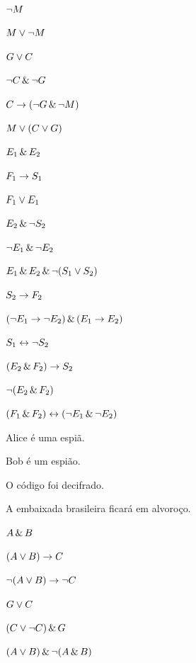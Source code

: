 \begin{earg}
\item $\neg M$
\item $M \vee \neg M$
\item $G \vee C$
\item $\neg C \,\&\, \neg G$
\item $C \rightarrow (\neg G \,\&\, \neg M)$
\item $M \vee (C \vee G)$
\end{earg}


\begin{earg}
\item $E_1 \,\&\, E_2$
\item $F_1 \rightarrow S_1$
\item $F_1 \vee E_1$
\item $E_2 \,\&\, \neg S_2$
\item $\neg E_1 \,\&\, \neg E_2$
\item $E_1 \,\&\, E_2 \,\&\, \neg(S_1 \vee S_2)$
\item $S_2 \rightarrow F_2$
\item $(\neg E_1 \rightarrow \neg E_2) \,\&\, (E_1 \rightarrow E_2)$
\item $S_1 \leftrightarrow \neg S_2$
\item $(E_2 \,\&\, F_2) \rightarrow S_2$
\item $\neg(E_2 \,\&\, F_2)$
\item $(F_1 \,\&\, F_2) \leftrightarrow (\neg E_1 \,\&\, \neg E_2)$
\end{earg}

\begin{ekey}
\item[A:] Alice é uma espiã.
\item[B:] Bob é um espião.
\item[C:] O código foi decifrado.
\item[G:] A embaixada brasileira ficará em alvoroço.
\end{ekey}
\begin{earg}
\item %
$A \,\&\, B$
\item %
$(A \vee B) \rightarrow C$
\item %
$\neg(A \vee B) \rightarrow \neg C$
\item %
$G \vee C$
\item %
$(C \vee \neg C) \,\&\, G$
\item %
$(A \vee B) \,\&\, \neg(A \,\&\, B)$
\end{earg}


